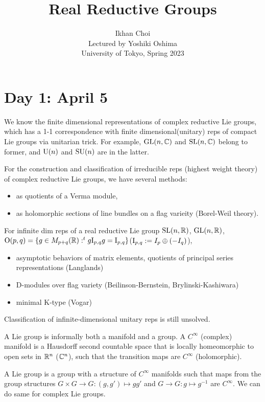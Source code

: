 \documentclass{../../small}
\begin{document}
\title{Real Reductive Groups}
\author{Ikhan Choi\\Lectured by Yoshiki Oshima\\University of Tokyo, Spring 2023}
\maketitle
\tableofcontents

\newpage
\section{Day 1: April 5}

We know the finite dimensional representations of complex reductive Lie groups, which has a 1-1 correspondence with finite dimensional(unitary) reps of compact Lie groups via unitarian trick.
For example, $\mathrm{GL}(n,\mathbb{C})$ and $\mathrm{SL}(n,\mathbb{C})$ belong to former, and $\mathrm{U}(n)$ and $\mathrm{SU}(n)$ are in the latter.

For the construction and classification of irreducible reps (highest weight theory) of complex reductive Lie groups, we have several methods:
\begin{itemize}
\item as quotients of a Verma module,
\item as holomorphic sections of line bundles on a flag varieity (Borel-Weil theory).
\end{itemize}

For infinite dim reps of a real reductive Lie group $\mathrm{SL}(n,\mathbb{R})$, $\mathrm{GL}(n,\mathbb{R})$, $\mathrm{O}(p,q)=\{g\in M_{p+q}(\mathbb{R}):^tg\mathrm{I}_{p,q}g=\mathrm{I}_{p,q}\}$($\mathrm{I}_{p,q}:=I_p\oplus(-I_q)$),
\begin{itemize}
\item asymptotic behaviors of matrix elements, quotients of principal series representations (Langlands)
\item D-modules over flag variety (Beilinson-Bernstein, Brylinski-Kashiwara)
\item minimal K-type (Vogar)
\end{itemize}

Classification of infinite-dimensional unitary reps is still unsolved.

\bigskip

\begin{defn}
A Lie group is informally both a manifold and a group.
A $C^\infty$ (complex) manifold is a Hausdorff second countable space that is locally homeomorphic to open sets in $\mathbb{R}^n$ ($\mathbb{C}^n$), such that the transition maps are $C^\infty$ (holomorphic).

A Lie group is a group with a structure of $C^\infty$ manifolds such that maps from the group structures $G\times G\to G:(g,g')\mapsto gg'$ and $G\to G:g\mapsto g^{-1}$ are $C^\infty$.
We can do same for complex Lie groups.
\end{defn}
\end{document}
